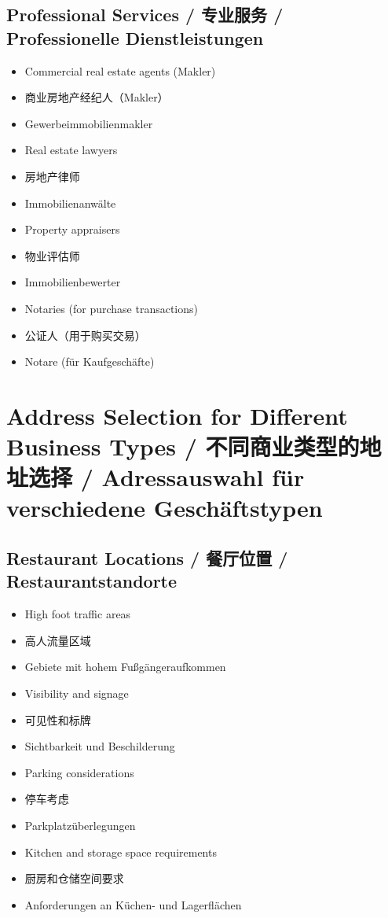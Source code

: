 \subsection{Professional Services / 专业服务 / Professionelle Dienstleistungen}
\begin{itemize}
    \item Commercial real estate agents (Makler)
    \item 商业房地产经纪人（Makler）
    \item Gewerbeimmobilienmakler
    \item Real estate lawyers
    \item 房地产律师
    \item Immobilienanwälte
    \item Property appraisers
    \item 物业评估师
    \item Immobilienbewerter
    \item Notaries (for purchase transactions)
    \item 公证人（用于购买交易）
    \item Notare (für Kaufgeschäfte)
\end{itemize}

\section{Address Selection for Different Business Types / 不同商业类型的地址选择 / Adressauswahl für verschiedene Geschäftstypen}

\subsection{Restaurant Locations / 餐厅位置 / Restaurantstandorte}
\begin{itemize}
    \item High foot traffic areas
    \item 高人流量区域
    \item Gebiete mit hohem Fußgängeraufkommen
    \item Visibility and signage
    \item 可见性和标牌
    \item Sichtbarkeit und Beschilderung
    \item Parking considerations
    \item 停车考虑
    \item Parkplatzüberlegungen
    \item Kitchen and storage space requirements
    \item 厨房和仓储空间要求
    \item Anforderungen an Küchen- und Lagerflächen
\end{itemize}

